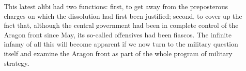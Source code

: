 This latest alibi had two functions: first, to get away from the preposterous charges on which the dissolution had first been justified; second, to cover up the fact that, although the central government had been in complete control of the Aragon front since May, its so-called offensives had been fiascos. The infinite infamy of all this will become apparent if we now turn to the military question itself and examine the Aragon front as part of the whole program of military strategy.